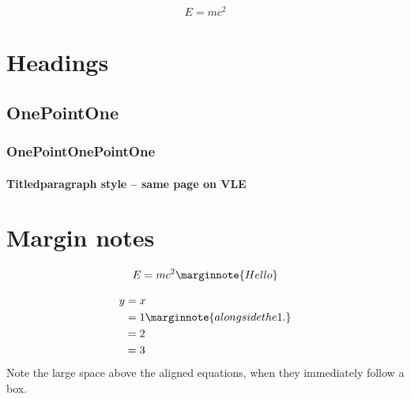 \documentclass[solutionsatend]{ouunit}
\author{Robert Hasson}
\newenvironment{highlight}[1][]{\begin{style2box}[#1]}{\end{style2box}}
\begin{document}
\makefrontpages
\introduction
\lipsum[133]
\[
E=mc^2
\]
\lipsum[133]
\section{Headings}
\lipsum[133]
\subsection{OnePointOne}
\lipsum[133]
\subsubsection{OnePointOnePointOne}
\lipsum[133]
\paragraph{Titledparagraph style -- same page on VLE}
\lipsum[133]
\section{Margin notes}
\begin{highlight}
\lipsum[133]

\lipsum[133]
\[
E=mc^2\marginnote{Hello}
\]
\end{highlight}
\lipsum[133]
\begin{highlight}
\lipsum[133]
\end{highlight}
\begin{align*}
y &=x\\
&=1\marginnote{alongside the 1.}\\
&=2\\
&=3
\end{align*}
Note the large space above the aligned equations, when they immediately follow a box.
\begin{highlight}[Title]
\lipsum[133]
\end{highlight}
\end{document}
